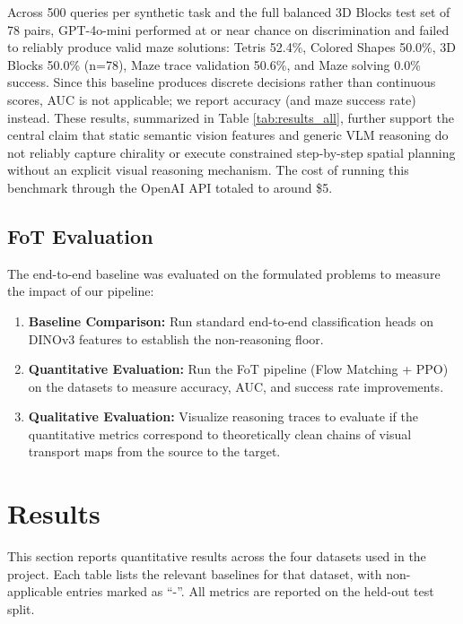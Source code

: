 \documentclass{l4proj}
\begin{document}
Across 500 queries per synthetic task and the full balanced 3D Blocks test set of 78 pairs, GPT-4o-mini performed at or near chance on discrimination and failed to reliably produce valid maze solutions: Tetris 52.4\%, Colored Shapes 50.0\%, 3D Blocks 50.0\% (n=78), Maze trace validation 50.6\%, and Maze solving 0.0\% success. Since this baseline produces discrete decisions rather than continuous scores, AUC is not applicable; we report accuracy (and maze success rate) instead. These results, summarized in Table \ref{tab:results_all}, further support the central claim that static semantic vision features and generic VLM reasoning do not reliably capture chirality or execute constrained step-by-step spatial planning without an explicit visual reasoning mechanism. The cost of running this benchmark through the OpenAI API totaled to around \$5.



\subsection{FoT Evaluation}
The end-to-end baseline was evaluated on the formulated problems to measure the impact of our pipeline:

\begin{enumerate}
    \item \textbf{Baseline Comparison:} Run standard end-to-end classification heads on DINOv3 features to establish the non-reasoning floor.
    \item \textbf{Quantitative Evaluation:} Run the FoT pipeline (Flow Matching + PPO) on the datasets to measure accuracy, AUC, and success rate improvements.
    \item \textbf{Qualitative Evaluation:} Visualize reasoning traces to evaluate if the quantitative metrics correspond to theoretically clean chains of visual transport maps from the source to the target.
\end{enumerate}


\section{Results}

This section reports quantitative results across the four datasets used in the project. Each table lists the relevant baselines for that dataset, with non-applicable entries marked as ``-''. All metrics are reported on the held-out test split.
\end{document}
